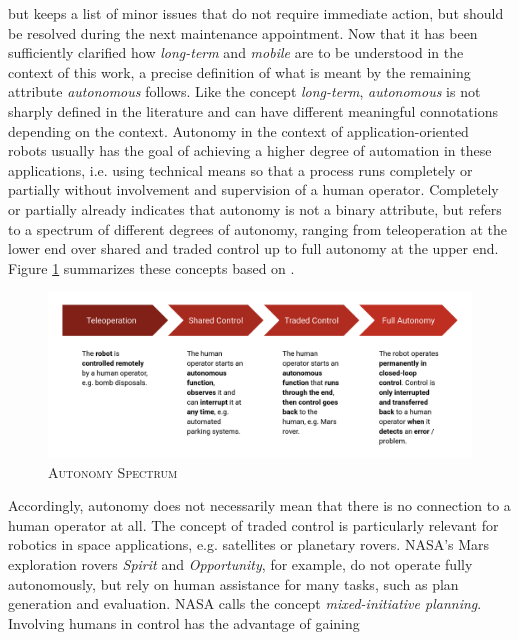 \documentclass[english, master, utf8]{base/thesis_KBS}
\begin{document}
but keeps a list of minor issues that do not require immediate action, but should be resolved during the next maintenance
appointment.\newline
Now that it has been sufficiently clarified how \textit{long-term} and \textit{mobile} are to be understood in the context of this work,
a precise definition of what is meant by the remaining attribute \textit{autonomous} follows.
Like the concept \textit{long-term}, \textit{autonomous} is not sharply defined in the literature and can have different meaningful connotations depending
on the context. Autonomy in the context of application-oriented robots usually has the goal of achieving a higher degree of automation in these applications,
i.e. using technical means so that a process runs completely or partially without involvement and supervision of a human operator. \cite{Hertzberg:2015}
Completely or partially already indicates that autonomy is not a binary attribute, but refers to a spectrum of different degrees of autonomy,
ranging from teleoperation at the lower end over shared and traded control up to full autonomy at the upper end. \cite{Hertzberg:2015}
Figure \ref{fig:autonomy_spectrum} summarizes these concepts based on \cite{Hertzberg:2015}.
\begin{figure}[H]
    \centering
    \includegraphics[width=\textwidth]{pics/autonomy_spectrum.png}
    \caption{\textsc{Autonomy Spectrum}}
    \label{fig:autonomy_spectrum}
\end{figure}
\noindent
Accordingly, autonomy does not necessarily mean that there is no connection to a human operator at all.
The concept of traded control is particularly relevant for robotics in space applications, e.g. satellites or planetary rovers.
NASA's Mars exploration rovers \textit{Spirit} and \textit{Opportunity}, for example, do not operate fully autonomously, but rely on human assistance for many tasks,
such as plan generation and evaluation. \cite{Bresina:2005} NASA calls the concept \textit{mixed-initiative planning}. Involving humans in control has the advantage of gaining
\end{document}
